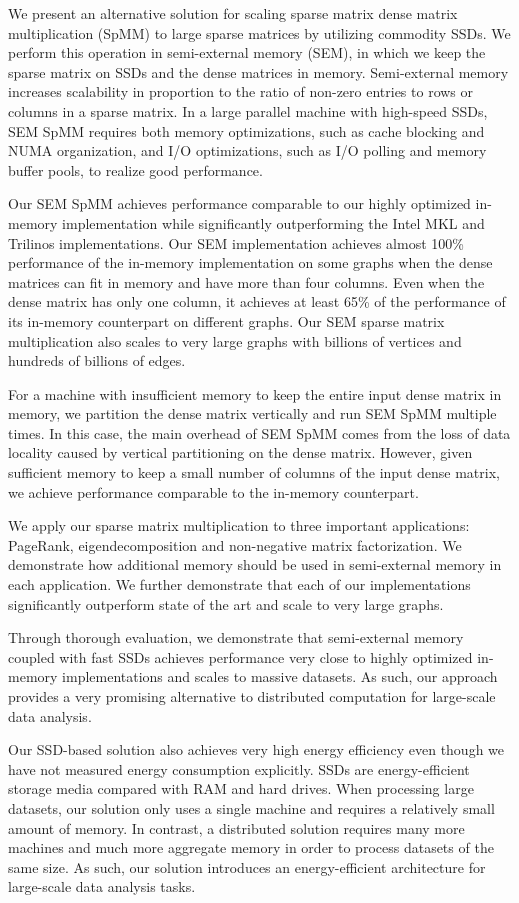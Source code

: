 We present an alternative solution for scaling sparse matrix dense matrix
multiplication (SpMM) to large sparse matrices by utilizing commodity SSDs.
We perform this operation in semi-external memory (SEM), in which
we keep the sparse matrix on SSDs and the dense matrices in memory. Semi-external
memory increases scalability in proportion to the ratio of non-zero entries
to rows or columns in a sparse matrix. In a large parallel machine with
high-speed SSDs, SEM SpMM requires both memory optimizations, such as cache
blocking and NUMA organization, and I/O optimizations, such as I/O polling and
memory buffer pools, to realize good performance.

Our SEM SpMM achieves performance comparable to our highly optimized in-memory
implementation while significantly outperforming the Intel MKL and
Trilinos implementations. Our SEM implementation achieves almost 100\% performance
of the in-memory implementation on some graphs when the dense matrices can fit
in memory and have more than four columns. Even when the dense matrix has only
one column, it achieves at least 65\% of the performance of its in-memory counterpart
on different graphs. Our SEM sparse matrix multiplication also scales to very
large graphs with billions of vertices and hundreds of billions of edges.

For a machine with insufficient memory to keep the entire input dense matrix
in memory, we partition the dense matrix vertically and run SEM SpMM multiple
times. In this case, the main overhead of SEM SpMM comes from the loss of
data locality caused by vertical partitioning on the dense matrix. However,
given sufficient memory to keep a small number of columns of the input dense
matrix, we achieve performance comparable to the in-memory counterpart.

We apply our sparse matrix multiplication to three important applications:
PageRank, eigendecomposition and non-negative matrix factorization. We demonstrate
how additional memory should be used in semi-external memory in each application.
We further demonstrate that each of our implementations significantly outperform
state of the art and scale to very large graphs.

Through thorough evaluation, we demonstrate that semi-external memory
coupled with fast SSDs achieves performance very close to highly optimized
in-memory implementations and scales to massive datasets.
As such, our approach provides a very promising alternative to distributed
computation for large-scale data analysis.

Our SSD-based solution also achieves very high energy efficiency even though
we have not measured energy consumption explicitly. SSDs are energy-efficient
storage media \cite{Tsirogiannis} compared with RAM and hard drives.
When processing large datasets, our solution only uses
a single machine and requires a relatively small amount of memory. In contrast,
a distributed solution requires many more machines and much more aggregate
memory in order to process datasets of the same size. As such, our solution
introduces an energy-efficient architecture for large-scale data analysis tasks.

